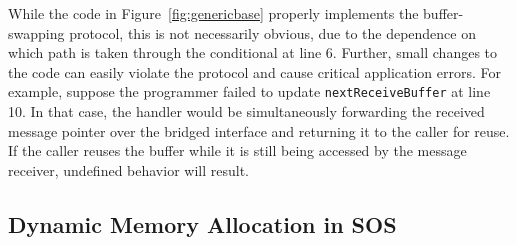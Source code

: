 While the code in Figure~\ref{fig:genericbase} properly implements the
buffer-swapping protocol, this is not necessarily obvious, due to the
dependence on which path is taken through the conditional at line 6.  
Further, small changes to the code can easily violate the
protocol and cause critical application errors.  For example, suppose
the programmer failed to update {\tt nextReceiveBuffer} at line 10.
In that case, the handler would be simultaneously forwarding the
received message pointer over the bridged interface and returning it to the
caller for reuse.  If the caller reuses the buffer while it is still
being accessed by the message receiver, undefined behavior will result.   






\subsection{Dynamic Memory Allocation in SOS}

